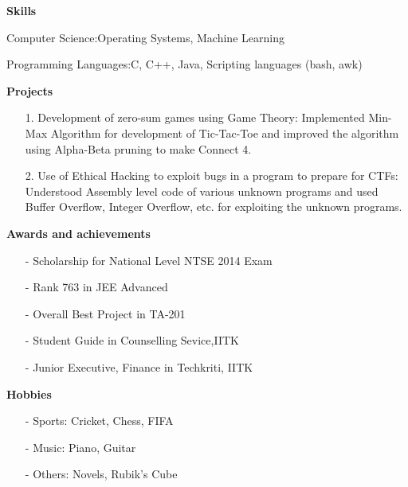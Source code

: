 \documentclass{article}
\begin{document}
\vspace{0.5cm}
\par
\textbf{Skills}
\vspace{0.2cm}
\par
Computer Science\hspace{1.5cm}:\hspace{0.5cm}Operating Systems, Machine Learning
\par
Programming Languages\hspace{0.5cm}:\hspace{0.5cm}C, C++, Java, Scripting languages (bash, awk)
\vspace{0.5cm}
\par
\textbf{Projects}
\begin{itemize}
\item[1.] Development of zero-sum games using Game Theory: Implemented Min-Max Algorithm for development of Tic-Tac-Toe and improved the algorithm using Alpha-Beta pruning to make Connect 4.
\item[2.] Use of Ethical Hacking to exploit bugs in a program to prepare for CTFs: Understood Assembly level code of various unknown programs and used Buffer Overflow, Integer Overflow, etc. for exploiting the unknown programs.
\end{itemize}
\par
\textbf{Awards and achievements}
\begin{itemize}
\item[-] Scholarship for National Level NTSE 2014 Exam
\item[-] Rank 763 in JEE Advanced
\item[-] Overall Best Project in TA-201
\item[-] Student Guide in Counselling Sevice,IITK
\item[-] Junior Executive, Finance in Techkriti, IITK
\end{itemize}
\par
\textbf{Hobbies}
\begin{itemize}
\item[-] Sports: Cricket, Chess, FIFA
\item[-] Music: Piano, Guitar
\item[-] Others: Novels, Rubik's Cube
\end{itemize}
\end{document}
